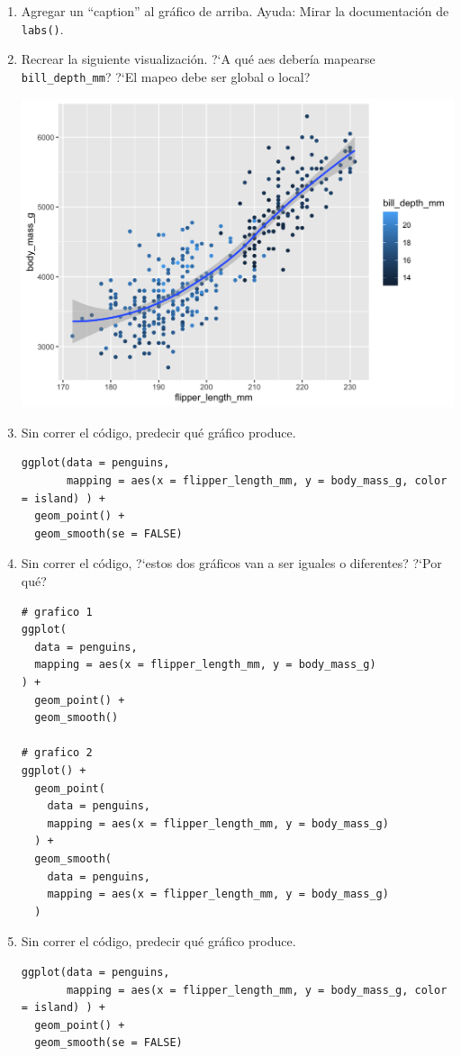 \documentclass[a4paper,11pt]{article}
\theoremstyle{definition}
\begin{document}
\begin{enumerate}[resume]
\item Agregar un ``caption'' al gr\'afico de arriba. Ayuda: Mirar la documentaci\'on de \lstinline{labs()}.

\item Recrear la siguiente visualizaci\'on. ?`A qu\'e aes deber\'ia mapearse \lstinline{bill_depth_mm}? ?`El mapeo debe ser global o local?
\begin{center}
\includegraphics[scale=0.3]{practica2-img-penguins-mass.png}
\end{center}

\item Sin correr el c\'odigo, predecir qu\'e gr\'afico produce.
\begin{lstlisting}
ggplot(data = penguins,
       mapping = aes(x = flipper_length_mm, y = body_mass_g, color = island) ) +
  geom_point() +
  geom_smooth(se = FALSE)
\end{lstlisting}

\item Sin correr el c\'odigo, ?`estos dos gr\'aficos van a ser iguales o diferentes? ?`Por qu\'e?
\begin{lstlisting}
# grafico 1
ggplot(
  data = penguins,
  mapping = aes(x = flipper_length_mm, y = body_mass_g)
) +
  geom_point() +
  geom_smooth()

# grafico 2
ggplot() +
  geom_point(
    data = penguins,
    mapping = aes(x = flipper_length_mm, y = body_mass_g)
  ) +
  geom_smooth(
    data = penguins,
    mapping = aes(x = flipper_length_mm, y = body_mass_g)
  )
\end{lstlisting}

\item Sin correr el c\'odigo, predecir qu\'e gr\'afico produce.
\begin{lstlisting}
ggplot(data = penguins,
       mapping = aes(x = flipper_length_mm, y = body_mass_g, color = island) ) +
  geom_point() +
  geom_smooth(se = FALSE)
\end{lstlisting}


\end{enumerate}
\end{document}
